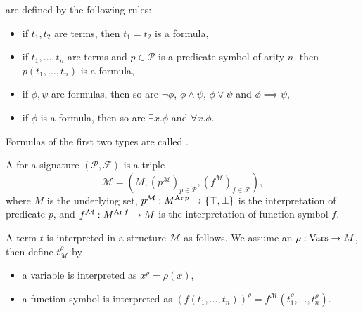 \begin{definition}
   are defined by the following rules:
  \begin{itemize}
  \item if $t_1, t_2$ are terms, then $t_1 = t_2$ is a formula,
  \item if $t_1, \ldots, t_n$ are terms and $p \in \mathcal{P}$ is a predicate
	symbol of arity $n$, then $p(t_1, \ldots, t_n)$ is a formula,
  \item if $\phi, \psi$ are formulas, then so are
	$\lnot \phi$, $\phi \land \psi$, $\phi \lor \psi$ and $\phi \implies \psi$,
  \item if $\phi$ is a formula, then so are $\exists x . \phi$ and $\forall x . \phi$.
  \end{itemize}
  Formulas of the first two types are called .
\end{definition}

\begin{definition}
  A  for a signature $(\mathcal{P}, \mathcal{F})$ is a triple
  \[
	\mathcal{M} = \left( M, (p^{\mathcal{M}})_{p \in \mathcal{P}},
	  (f^{\mathcal{M}})_{f \in \mathcal{F}} \right),
  \]
  where $M$ is the underlying set, $p^{\mathcal{M}}: M^{\operatorname{Ar} p} \to \{\top,
  \bot\}$ is the interpretation of predicate $p$, and $f^{\mathcal{M}}: M^{\operatorname{Ar}
	f} \to M$ is the interpretation of function symbol $f$.
\end{definition}

A term $t$ is interpreted in a structure $\mathcal{M}$ as follows.
We assume an  $\rho: \operatorname{Vars} \to M$, then define
$t_{\mathcal{M}}^\rho$ by
\begin{itemize}
\item a variable is interpreted as $x^\rho = \rho(x)$,
\item a function symbol is interpreted as $\left( f(t_1, \ldots, t_n)
  \right)^\rho = f^{\mathcal{M}}(t_1^\rho, \ldots, t_n^\rho)$.
\end{itemize}

